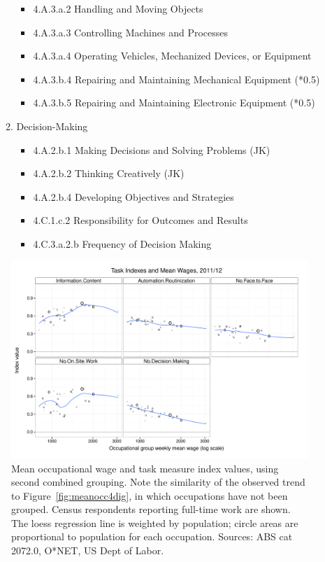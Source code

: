 \begin{enumerate}[A.]
\begin{enumerate}[1.]
\begin{itemize}
  \item 4.A.3.a.2 Handling and Moving Objects 
  \item 4.A.3.a.3 Controlling Machines and Processes 
  \item 4.A.3.a.4 Operating Vehicles, Mechanized Devices, or Equipment 
  \item 4.A.3.b.4 Repairing and Maintaining Mechanical Equipment (*0.5) 
  \item 4.A.3.b.5 Repairing and Maintaining Electronic Equipment (*0.5)
\end{itemize}
\item Decision-Making 
\begin{itemize}
\item 4.A.2.b.1 Making Decisions and Solving Problems (JK) 
\item 4.A.2.b.2 Thinking Creatively (JK) 
\item 4.A.2.b.4 Developing Objectives and Strategies 
\item 4.C.1.c.2 Responsibility for Outcomes and Results 
\item 4.C.3.a.2.b Frequency of Decision Making
\end{itemize}
\end{enumerate}
\end{enumerate}

\begin{figure}
  \centering
  \includegraphics[width=\textwidth]{../figure/wages_indexes.pdf}
  \caption{Mean occupational wage and task measure index values, using second combined grouping. Note the similarity of the observed trend to Figure~\ref{fig:meanocc4dig}, in which occupations have not been grouped. Census respondents reporting full-time work are shown. The loess regression line is weighted by population; circle areas are proportional to population for each occupation. Sources: ABS cat 2072.0, O*NET, US Dept of Labor.}
  \label{fig:meanocc2}
\end{figure}

